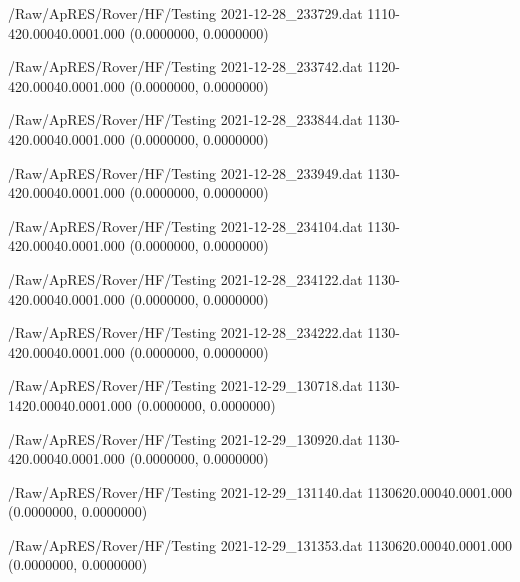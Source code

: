 \hfaprestable
{/Raw/ApRES/Rover/HF/Testing}%
{2021-12-28\_233729.dat}%
{1}{1}{10}{-4}{20.000}{40.000}{1.000}%
{ (0.0000000, 0.0000000)}%
{}%
{}%

\hfaprestable
{/Raw/ApRES/Rover/HF/Testing}%
{2021-12-28\_233742.dat}%
{1}{1}{20}{-4}{20.000}{40.000}{1.000}%
{ (0.0000000, 0.0000000)}%
{}%
{}%

\hfaprestable
{/Raw/ApRES/Rover/HF/Testing}%
{2021-12-28\_233844.dat}%
{1}{1}{30}{-4}{20.000}{40.000}{1.000}%
{ (0.0000000, 0.0000000)}%
{}%
{}%

\hfaprestable
{/Raw/ApRES/Rover/HF/Testing}%
{2021-12-28\_233949.dat}%
{1}{1}{30}{-4}{20.000}{40.000}{1.000}%
{ (0.0000000, 0.0000000)}%
{}%
{}%

\hfaprestable
{/Raw/ApRES/Rover/HF/Testing}%
{2021-12-28\_234104.dat}%
{1}{1}{30}{-4}{20.000}{40.000}{1.000}%
{ (0.0000000, 0.0000000)}%
{}%
{}%

\hfaprestable
{/Raw/ApRES/Rover/HF/Testing}%
{2021-12-28\_234122.dat}%
{1}{1}{30}{-4}{20.000}{40.000}{1.000}%
{ (0.0000000, 0.0000000)}%
{}%
{}%

\hfaprestable
{/Raw/ApRES/Rover/HF/Testing}%
{2021-12-28\_234222.dat}%
{1}{1}{30}{-4}{20.000}{40.000}{1.000}%
{ (0.0000000, 0.0000000)}%
{}%
{}%

\hfaprestable
{/Raw/ApRES/Rover/HF/Testing}%
{2021-12-29\_130718.dat}%
{1}{1}{30}{-14}{20.000}{40.000}{1.000}%
{ (0.0000000, 0.0000000)}%
{}%
{}%

\hfaprestable
{/Raw/ApRES/Rover/HF/Testing}%
{2021-12-29\_130920.dat}%
{1}{1}{30}{-4}{20.000}{40.000}{1.000}%
{ (0.0000000, 0.0000000)}%
{}%
{}%

\hfaprestable
{/Raw/ApRES/Rover/HF/Testing}%
{2021-12-29\_131140.dat}%
{1}{1}{30}{6}{20.000}{40.000}{1.000}%
{ (0.0000000, 0.0000000)}%
{}%
{}%

\hfaprestable
{/Raw/ApRES/Rover/HF/Testing}%
{2021-12-29\_131353.dat}%
{1}{1}{30}{6}{20.000}{40.000}{1.000}%
{ (0.0000000, 0.0000000)}%
{}%
{}%

